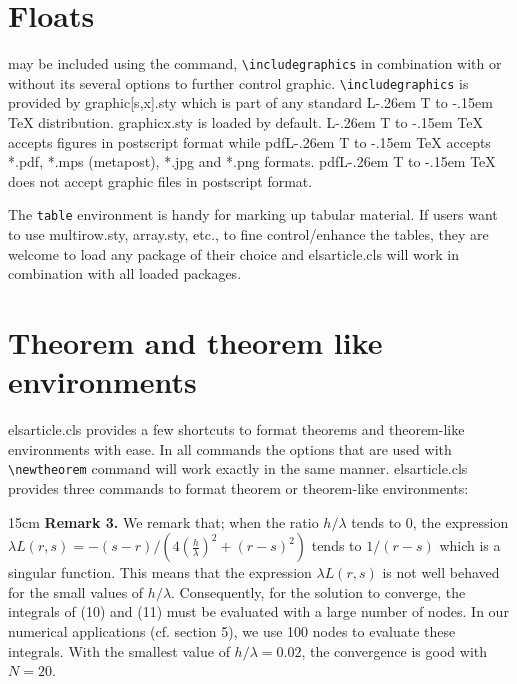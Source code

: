 \documentclass[a4paper,12pt]{article}
\makeatletter
\def\file#1{\textsf{#1}\xspace}
\def\LastPage{19}
\DeclareRobustCommand{\LaTeX}{L\kern-.26em%
        {\sbox\z@ T%
         \vbox to\ht\z@{\hbox{\check@mathfonts
           \fontsize\sf@size\z@
           \math@fontsfalse\selectfont
          A\,}%
         \vss}%
        }%
     \kern-.15em%
    \TeX}
\makeatother
\begin{document}
\npskip=0mm
\pinclude{\copy\contbox\printSq{\LastPage}}

\vspace*{-12pt}
\section{Floats}
\hypertarget{floats}{}
 may be included using the command,
\verb+\includegraphics+ in combination with or without its
several options to further control graphic.
\verb+\includegraphics+ is provided by \file{graphic[s,x].sty}
which is part of any standard \LaTeX{} distribution.
\file{graphicx.sty} is loaded by default. \LaTeX{} accepts
figures in postscript format while pdf\LaTeX{} accepts
\file{*.pdf}, \file{*.mps} (metapost), \file{*.jpg} and
\file{*.png} formats.  pdf\LaTeX{} does not accept
graphic files in postscript format.

The \verb+table+ environment is handy for marking up tabular
material. If users want to use \file{multirow.sty},
\file{array.sty}, etc., to fine control/enhance the tables, they
are welcome to load any package of their choice and
\file{elsarticle.cls} will work in combination with all loaded
packages.

\vspace*{-12pt}
\section{Theorem and theorem like environments}
\hypertarget{theorems}{}

\file{elsarticle.cls} provides a few shortcuts to format theorems and
theorem-like environments with ease. In all commands the options
that are used with \verb+\newtheorem+ command will work exactly
in the same manner.  \file{elsarticle.cls} provides three
commands to format theorem or theorem-like environments:

\begin{vquote}
 \newtheorem{thm}{Theorem}
 \newtheorem{lem}[thm]{Lemma}
\end{vquote}

\begin{toolwrite}{15cm}
\let\la\lambda
\noindent\textbf{Remark 3.}\enspace
We remark that; when the ratio $h/\la$ tends to 0, the expression $\la
L(r,s)=-(s-r)/(4\left(\frac{h}{\la}\right)^2+(r-s)^2)$ tends to
$1/(r-s)$ which is a singular function. This means that the expression
$\la L(r,s)$ is not well behaved for the small values of
$h/\la$. Consequently, for the solution to converge, the integrals of
(10) and (11) must be evaluated with a large number of
nodes. In our numerical applications (cf. section 5), we
use 100 nodes to evaluate these integrals. With the smallest value of
$h/\la=0.02$, the convergence is good with $N=20$.
\end{toolwrite}
\end{document}
